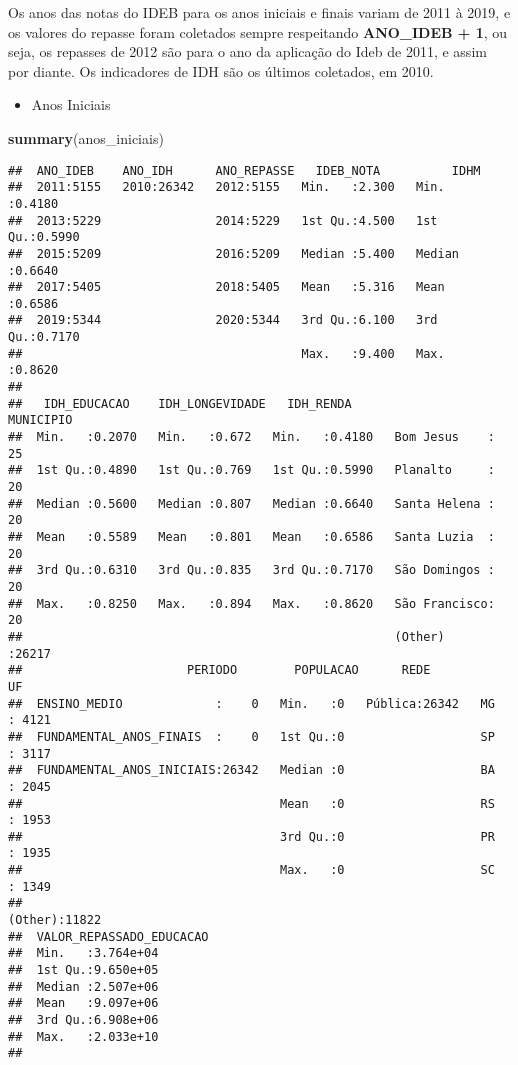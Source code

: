 \documentclass[
]{article}
\newenvironment{Shaded}{\begin{snugshade}}{\end{snugshade}}
\newcommand{\KeywordTok}[1]{\textcolor[rgb]{0.13,0.29,0.53}{\textbf{#1}}}
\newcommand{\NormalTok}[1]{#1}
\providecommand{\tightlist}{%
  \setlength{\itemsep}{0pt}\setlength{\parskip}{0pt}}
\begin{document}
Os anos das notas do IDEB para os anos iniciais e finais variam de 2011
à 2019, e os valores do repasse foram coletados sempre respeitando
\textbf{ANO\_IDEB + 1}, ou seja, os repasses de 2012 são para o ano da
aplicação do Ideb de 2011, e assim por diante. Os indicadores de IDH são
os últimos coletados, em 2010.

\begin{itemize}
\tightlist
\item
  Anos Iniciais
\end{itemize}

\begin{Shaded}
\begin{Highlighting}[]
\KeywordTok{summary}\NormalTok{(anos\_iniciais)}
\end{Highlighting}
\end{Shaded}

\begin{verbatim}
##  ANO_IDEB    ANO_IDH      ANO_REPASSE   IDEB_NOTA          IDHM       
##  2011:5155   2010:26342   2012:5155   Min.   :2.300   Min.   :0.4180  
##  2013:5229                2014:5229   1st Qu.:4.500   1st Qu.:0.5990  
##  2015:5209                2016:5209   Median :5.400   Median :0.6640  
##  2017:5405                2018:5405   Mean   :5.316   Mean   :0.6586  
##  2019:5344                2020:5344   3rd Qu.:6.100   3rd Qu.:0.7170  
##                                       Max.   :9.400   Max.   :0.8620  
##                                                                       
##   IDH_EDUCACAO    IDH_LONGEVIDADE   IDH_RENDA              MUNICIPIO    
##  Min.   :0.2070   Min.   :0.672   Min.   :0.4180   Bom Jesus    :   25  
##  1st Qu.:0.4890   1st Qu.:0.769   1st Qu.:0.5990   Planalto     :   20  
##  Median :0.5600   Median :0.807   Median :0.6640   Santa Helena :   20  
##  Mean   :0.5589   Mean   :0.801   Mean   :0.6586   Santa Luzia  :   20  
##  3rd Qu.:0.6310   3rd Qu.:0.835   3rd Qu.:0.7170   São Domingos :   20  
##  Max.   :0.8250   Max.   :0.894   Max.   :0.8620   São Francisco:   20  
##                                                    (Other)      :26217  
##                       PERIODO        POPULACAO      REDE             UF       
##  ENSINO_MEDIO             :    0   Min.   :0   Pública:26342   MG     : 4121  
##  FUNDAMENTAL_ANOS_FINAIS  :    0   1st Qu.:0                   SP     : 3117  
##  FUNDAMENTAL_ANOS_INICIAIS:26342   Median :0                   BA     : 2045  
##                                    Mean   :0                   RS     : 1953  
##                                    3rd Qu.:0                   PR     : 1935  
##                                    Max.   :0                   SC     : 1349  
##                                                                (Other):11822  
##  VALOR_REPASSADO_EDUCACAO
##  Min.   :3.764e+04       
##  1st Qu.:9.650e+05       
##  Median :2.507e+06       
##  Mean   :9.097e+06       
##  3rd Qu.:6.908e+06       
##  Max.   :2.033e+10       
## 
\end{verbatim}
\end{document}
